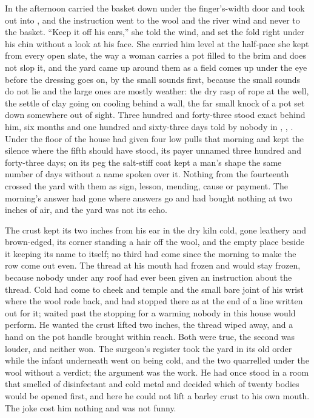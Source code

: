 In the afternoon  carried the basket down under the finger's-width door and took  out into , and the instruction went to the wool and the river wind and never to the basket. “Keep it off his ears,” she told the wind, and set the fold right under his chin without a look at his face. She carried him level at the half-pace she kept from every open slate, the way a woman carries a pot filled to the brim and does not slop it, and the yard came up around them as a field comes up under the eye before the dressing goes on, by the small sounds first, because the small sounds do not lie and the large ones are mostly weather: the dry rasp of rope at the well, the settle of clay going on cooling behind a wall, the far small knock of a pot set down somewhere out of sight. Three hundred and forty-three stood exact behind him, six months and one hundred and sixty-three days told by nobody in , , . Under the floor of the house  had given four low pulls that morning and kept the silence where the fifth should have stood, its payer unnamed three hundred and forty-three days; on its peg the salt-stiff coat kept a man's shape the same number of days without a name spoken over it. Nothing from the fourteenth crossed the yard with them as sign, lesson, mending, cause or payment. The morning's answer had gone where answers go and had bought nothing at two inches of air, and the yard was not its echo.

The crust kept its two inches from his ear in the dry kiln cold, gone leathery and brown-edged, its corner standing a hair off the wool, and the empty place beside it keeping its name to itself; no third had come since the morning to make the row come out even. The thread at his mouth had frozen and would stay frozen, because nobody under any roof had ever been given an instruction about the thread. Cold had come to cheek and temple and the small bare joint of his wrist where the wool rode back, and had stopped there as at the end of a line written out for it;  waited past the stopping for a warming nobody in this house would perform. He wanted the crust lifted two inches, the thread wiped away, and a hand on the pot handle brought within reach. Both were true, the second was louder, and neither won. The surgeon's register took the yard in its old order while the infant underneath went on being cold, and the two quarrelled under the wool without a verdict; the argument was the work. He had once stood in a room that smelled of disinfectant and cold metal and decided which of twenty bodies would be opened first, and here he could not lift a barley crust to his own mouth. The joke cost him nothing and was not funny.

